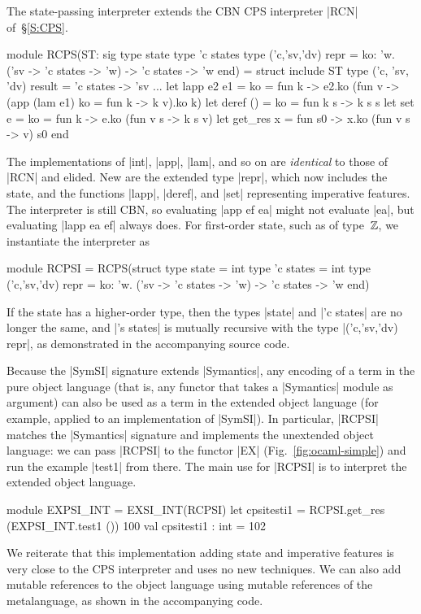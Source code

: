 The state-passing interpreter extends the CBN CPS
interpreter |RCN| of~\S\ref{S:CPS}.
\begin{code}
module RCPS(ST: sig 
  type state 
  type 'c states 
  type ('c,'sv,'dv) repr = 
      {ko: 'w. ('sv -> 'c states -> 'w) -> 'c states -> 'w}
end) = struct
  include ST
  type ('c, 'sv, 'dv) result = 'c states -> 'sv
  ... 
  let lapp e2 e1 = {ko = fun k ->
      e2.ko (fun v -> (app (lam e1) {ko = fun k -> k v}).ko k)}
  let deref () = {ko = fun k s -> k s s}
  let set e = {ko = fun k -> e.ko (fun v s -> k s v)}
  let get_res x = fun s0 -> x.ko (fun v s -> v) s0
end
\end{code}
The implementations of |int|, |app|, |lam|, and so on are
\emph{identical} to those of |RCN| and elided. New are the extended type
|repr|,
which now includes the state, and the functions
|lapp|, |deref|, and |set| representing imperative features. The
interpreter is still CBN, so evaluating |app ef ea| might not
evaluate |ea|, but evaluating |lapp ea ef| always does.
For first-order state, such as of type~$\mathbb{Z}$, we 
instantiate the interpreter as
\begin{code}
module RCPSI = RCPS(struct 
  type state = int
  type 'c states = int
  type ('c,'sv,'dv) repr = 
      {ko: 'w. ('sv -> 'c states -> 'w) -> 'c states -> 'w}
end)
\end{code}
If the state has a higher-order type, then the types |state| and |'c states|
are no longer the same, and |'s states| is mutually
recursive with the type |('c,'sv,'dv) repr|, as demonstrated in the
accompanying source code.

Because the |SymSI| signature extends |Symantics|, any encoding of
a term in the pure object language (that is, any functor that takes
a |Symantics| module as argument) can also be used as a term in the
extended object language (for example, applied to an implementation of
|SymSI|).  In particular,
|RCPSI| matches the |Symantics| signature and implements the
unextended object language: we can pass |RCPSI|
to the functor |EX| (Fig.~\ref{fig:ocaml-simple}) and run 
the example |test1| from there. The main use for |RCPSI| is to interpret the 
extended object language.
\begin{code}
module EXPSI_INT = EXSI_INT(RCPSI)
let cpsitesti1 = RCPSI.get_res (EXPSI_INT.test1 ()) 100
val cpsitesti1 : int = 102
\end{code}

We reiterate that this implementation adding state and imperative
features is very close to the CPS interpreter and uses no new
techniques.
We can also add mutable references to the object language using
mutable references of the metalanguage, as shown in the accompanying
code.
\fi
\fi

